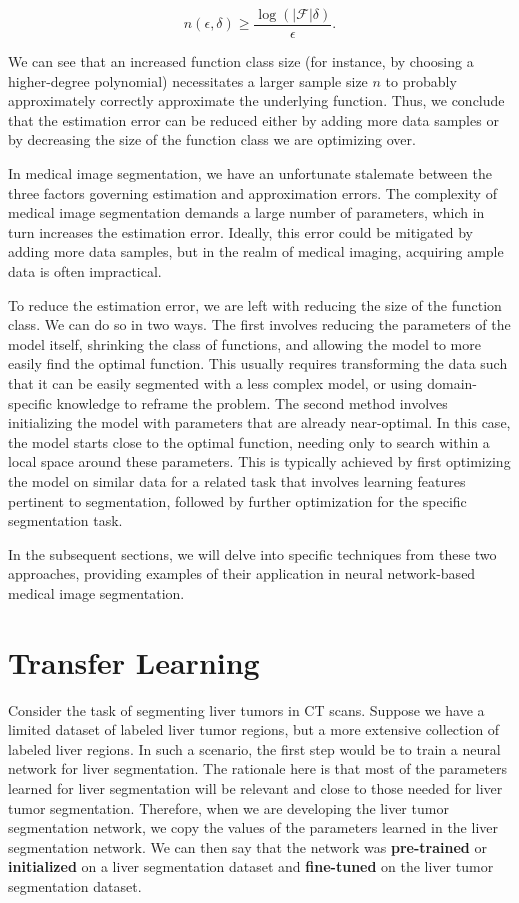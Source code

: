 \begin{equation}
	n(\epsilon, \delta) \geq \frac{\log(\lvert \mathcal{F} \rvert \delta)}{\epsilon}.
\end{equation}

We can see that an increased function class size (for instance, by choosing a higher-degree polynomial) necessitates a larger sample size $n$ to probably approximately correctly approximate the underlying function. Thus, we conclude that the estimation error can be reduced either by adding more data samples or by decreasing the size of the function class we are optimizing over.

In medical image segmentation, we have an unfortunate stalemate between the three factors governing estimation and approximation errors. The complexity of medical image segmentation demands a large number of parameters, which in turn increases the estimation error. Ideally, this error could be mitigated by adding more data samples, but in the realm of medical imaging, acquiring ample data is often impractical.

To reduce the estimation error, we are left with reducing the size of the function class. We can do so in two ways. The first involves reducing the parameters of the model itself, shrinking the class of functions, and allowing the model to more easily find the optimal function. This usually requires transforming the data such that it can be easily segmented with a less complex model, or using domain-specific knowledge to reframe the problem. The second method involves initializing the model with parameters that are already near-optimal. In this case, the model starts close to the optimal function, needing only to search within a local space around these parameters. This is typically achieved by first optimizing the model on similar data for a related task that involves learning features pertinent to segmentation, followed by further optimization for the specific segmentation task.

In the subsequent sections, we will delve into specific techniques from these two approaches, providing examples of their application in neural network-based medical image segmentation.

\section{Transfer Learning}

Consider the task of segmenting liver tumors in CT scans. Suppose we have a limited dataset of labeled liver tumor regions, but a more extensive collection of labeled liver regions. In such a scenario, the first step would be to train a neural network for liver segmentation. The rationale here is that most of the parameters learned for liver segmentation will be relevant and close to those needed for liver tumor segmentation. Therefore, when we are developing the liver tumor segmentation network, we copy the values of the parameters learned in the liver segmentation network. We can then say that the network was \textbf{pre-trained} or \textbf{initialized} on a liver segmentation dataset and \textbf{fine-tuned} on the liver tumor segmentation dataset.

